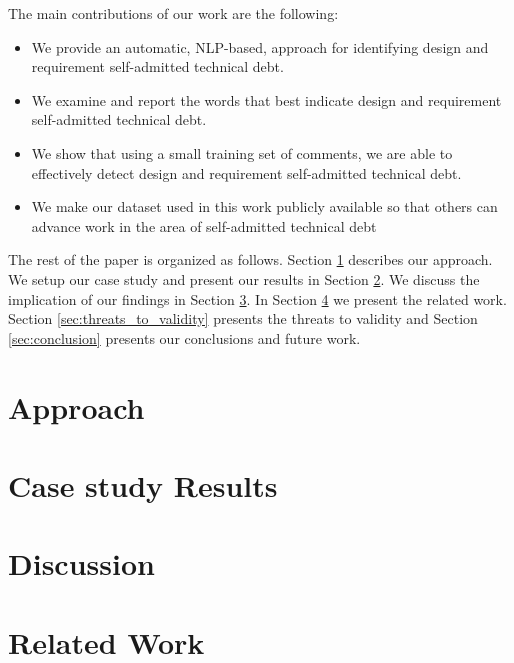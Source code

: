 \documentclass[10pt,journal,compsoc]{IEEEtran}
\newcommand{\SATD}{self-admitted technical debt\xspace}
\begin{document}
The main contributions of our work are the following:
\vspace{-1.5mm}
\begin{itemize}
  \item We provide an automatic, NLP-based, approach for identifying design and requirement \SATD.
  \item We examine and report the words that best indicate design and requirement \SATD.
  \item We show that using a small training set of comments, we are able to effectively detect design and requirement \SATD.
  \item We make our dataset used in this work publicly available so that others can advance work in the area of \SATD
\end{itemize}

The rest of the paper is organized as follows. Section \ref{sec:approach} describes our approach. We setup our case study and present our
results in Section \ref{sec:case_study_results}. We discuss the implication of our findings in Section \ref{sec:discussion}. In Section \ref{sec:related_work} we present the related work. Section \ref{sec:threats_to_validity} presents the threats to validity and Section \ref{sec:conclusion} presents our conclusions and future work.  

\section{Approach}
\label{sec:approach}


\section{Case study Results}
\label{sec:case_study_results}


\section{Discussion}
\label{sec:discussion}


\section{Related Work}
\label{sec:related_work}

\end{document}
